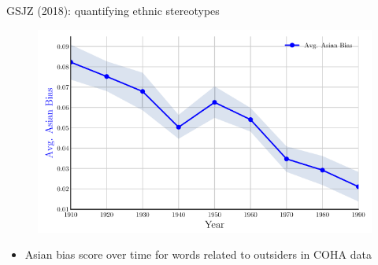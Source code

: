 \documentclass[usenames,dvipsnames,english]{beamer}
\begin{document}
\begin{frame}{GSJZ (2018): quantifying ethnic stereotypes}
\begin{figure}
    \centering
    \includegraphics[scale = 0.6]{Images/gsjz_quantify5.png}
\end{figure}
\begin{itemize}
    \item {\small Asian bias score over time for words related to outsiders in COHA data}
\end{itemize}
\end{frame}
\end{document}
